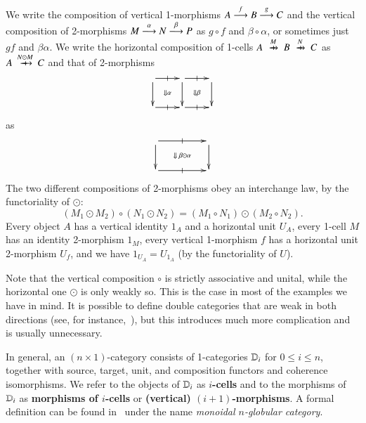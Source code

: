 \documentclass{amsart}
\begin{document}
We write the composition of vertical 1-morphisms $A\too[f] B\too[g] C$
and the vertical composition of 2-morphisms $M\too[\alpha]
N\too[\beta] P$ as $g\circ f$ and $\beta\circ\alpha$, or sometimes
just $gf$ and $\beta\alpha$.  We write the horizontal composition of
1-cells $A\xhto{M} B \xhto{N} C$ as $A\xhto{N\odot M} C$ and that of
2-morphisms
\[\vcenter{\xymatrix{ \ar[r]|-@{|}^-{} \ar[d] \ar@{}[dr]|{\Downarrow\alpha} &
     \ar[r]|-@{|}^-{} \ar[d] \ar@{}[dr]|{\Downarrow\beta} &\ar[d]\\
  \ar[r]|-@{|}_-{} & \ar[r]|-@{|}_-{} & }}\]
as
\[\vcenter{\xymatrix@C=4pc{ \ar[r]|-@{|}^-{} \ar[d] \ar@{}[dr]|{\Downarrow\;\be\odot\al} &  \ar[d]\\
  \ar[r]|-@{|}_-{} & }}\]
The two different compositions of 2-morphisms obey an interchange law,
by the functoriality of $\odot$:
\[(M_1\odot M_2) \circ (N_1\odot N_2) = (M_1\circ N_1)\odot (M_2\circ N_2).
\]
Every object $A$ has a vertical identity $1_A$ and a horizontal unit
$U_A$, every 1-cell $M$ has an identity 2-morphism $1_M$, every
vertical 1-morphism $f$ has a horizontal unit 2-morphism $U_f$, and we
have $1_{U_A} = U_{1_A}$ (by the functoriality of $U$).

Note that the vertical composition $\circ$ is strictly associative and
unital, while the horizontal one $\odot$ is only weakly so.  This is
the case in most of the examples we have in mind.  It is possible to
define double categories that are weak in both directions (see, for
instance,~\cite{verity:base-change}), but this introduces much more
complication and is usually unnecessary.

\begin{rmk}\label{rmk:monglob}
  In general, an $(n\times 1)$-category consists of 1-categories
  $\lD_i$ for $0\le i\le n$, together with source, target, unit, and
  composition functors and coherence isomorphisms.  We refer to the
  objects of $\lD_i$ as \textbf{$i$-cells} and to the morphisms of
  $\lD_i$ as \textbf{morphisms of $i$-cells} or \textbf{(vertical)
    $(i+1)$-morphisms}.  A formal definition can be found
  in~\cite{batanin:monglob} under the name \emph{monoidal $n$-globular
    category}.
\end{rmk}

\end{document}
